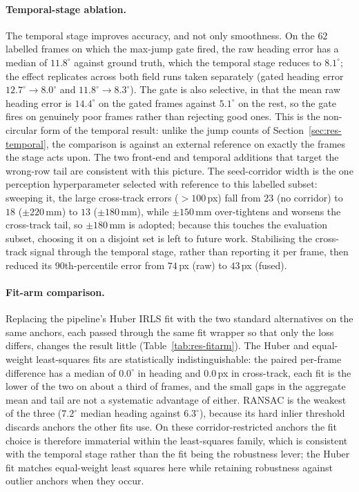 \paragraph{Temporal-stage ablation.}
The temporal stage improves accuracy, and not only smoothness. On the $62$
labelled frames on which the max-jump gate fired, the raw heading error has a
median of $11.8^\circ$ against ground truth, which the temporal stage reduces to
$8.1^\circ$; the effect replicates across both field runs taken separately (gated
heading error $12.7^\circ\!\to\!8.0^\circ$ and $11.8^\circ\!\to\!8.3^\circ$). The
gate is also selective, in that the mean raw heading error is
$14.4^\circ$ on the gated frames against $5.1^\circ$ on the rest, so the gate fires
on genuinely poor frames rather than rejecting good ones. This is the
non-circular form of the temporal result: unlike the jump counts of
Section~\ref{sec:res-temporal}, the comparison is against an external reference on
exactly the frames the stage acts upon. The two front-end and temporal additions
that target the wrong-row tail are consistent with this picture. The seed-corridor
width is the one perception hyperparameter selected with reference to this labelled
subset: sweeping it, the large cross-track errors ($>100$\,px) fall from $23$ (no
corridor) to $18$ ($\pm220$\,mm) to $13$ ($\pm180$\,mm), while $\pm150$\,mm
over-tightens and worsens the cross-track tail, so $\pm180$\,mm is adopted; because
this touches the evaluation subset, choosing it on a disjoint set is left to future
work. Stabilising the cross-track signal through the temporal stage, rather than
reporting it per frame, then reduced its 90th-percentile error from $74$\,px (raw)
to $43$\,px (fused).

\paragraph{Fit-arm comparison.}
Replacing the pipeline's Huber IRLS fit with the two standard alternatives on the
same anchors, each passed through the same fit wrapper so that only the loss
differs, changes the result little (Table~\ref{tab:res-fitarm}). The Huber and
equal-weight least-squares fits are statistically indistinguishable: the paired
per-frame difference has a median of $0.0^\circ$ in heading and $0.0$\,px in
cross-track, each fit is the lower of the two on about a third of frames, and the
small gaps in the aggregate mean and tail are not a systematic advantage of
either. RANSAC is the weakest of the three ($7.2^\circ$ median heading against
$6.3^\circ$), because its hard inlier threshold discards anchors the other fits
use. On these corridor-restricted anchors the fit choice is therefore immaterial
within the least-squares family, which is consistent with the temporal stage
rather than the fit being the robustness lever; the Huber fit matches
equal-weight least squares here while retaining robustness against outlier anchors
when they occur.

